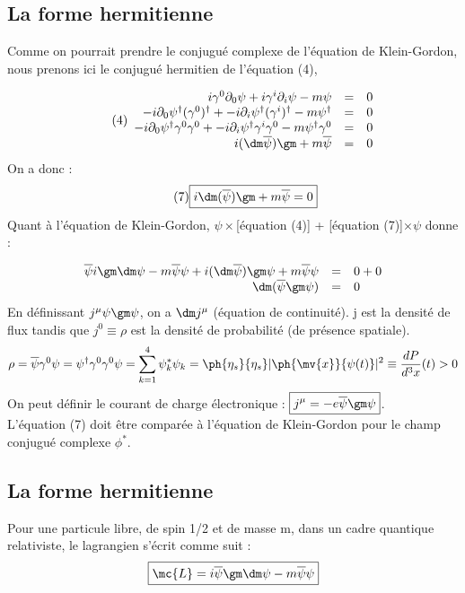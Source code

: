 \subsection{La forme hermitienne}

Comme on pourrait prendre le conjugué complexe de l’équation de Klein-Gordon,
nous prenons ici le conjugué hermitien de l’équation (4),

\[\tag{4}\begin{array}{ r c l }
i\gamma^0\partial_0\psi+i\gamma^i\partial_i\psi-m\psi & = & 0 \\
-i\partial_0\psi^\dagger(\gamma^0)^\dagger+-i\partial_i\psi^\dagger(\gamma^i)^\dagger-
  m\psi^\dagger & = & 0 \\
-i\partial_0\psi^\dagger\gamma^0\gamma^0+-i\partial_i\psi^\dagger\gamma^i\gamma^0-
  m\psi^\dagger\gamma^0 & = & 0 \\
i(\dm\overline{\psi})\gm+m\overline{\psi} & = & 0 \\
\end{array}\]
On a donc :
\[
\tag{7} \boxed{
i\dm(\overline{\psi})\gm+m\overline{\psi}=0
}
\]
Quant à l’équation de Klein-Gordon, $\psi\times$[équation (4)]
 + [équation (7)]$\times\psi$ donne :

\[\begin{array}{ r c l }
\overline{\psi}i\gm\dm\psi-m\overline{\psi}\psi+
i(\dm\overline{\psi})\gm\psi+m\overline{\psi}\psi & = & 0+0 \\
\dm(\overline{\psi}\gm\psi) & = & 0 \\
\end{array}\]
En définissant $j^\mu\psi\gm\psi$, on a $\dm j^\mu$ (équation de
continuité). j est la densité de flux tandis que $j^0\equiv\rho$ est la
densité de probabilité (de présence spatiale).
\[
\rho=\overline{\psi}\gamma^0\psi=\psi^\dagger\gamma^0\gamma^0\psi=\sum_{k=1}^4
\psi^*_k\psi_k=\ph{\eta_s}{\eta_s}|\ph{\mv{x}}{\psi(t)}|^2\equiv\frac{dP}{d^3x}(t)>0
\]
On peut définir le courant de charge électronique : $\boxed{j^\mu =
-e\overline{\psi}\gm\psi}$.\\

L'équation (7) doit être comparée à l'équation de Klein-Gordon pour le champ
conjugué complexe $\phi^*$.
\subsection{La forme hermitienne}
Pour une particule libre, de spin 1/2 et de masse m, dans un cadre quantique relativiste, le lagrangien s'écrit
comme suit :
\[\boxed{\mc{L}=i\overline{\psi}\gm\dm\psi-m\overline{\psi}\psi}\]

